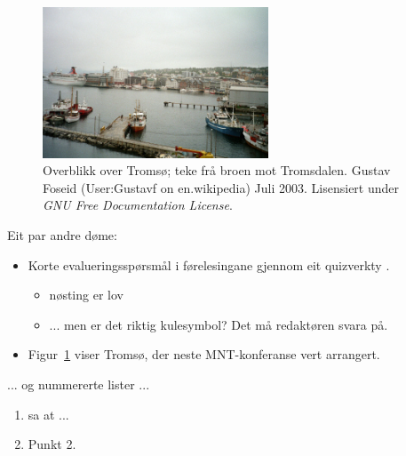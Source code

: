 \documentclass[nynorsk]{mnt}
\begin{document}
\begin{figure}
\begin{center}
  \includegraphics[width=0.6\textwidth]{tromso}
\end{center}
  \caption{Overblikk over Tromsø; teke frå broen mot Tromsdalen.
    Gustav Foseid (User:Gustavf on en.wikipedia)
    Juli 2003.
    Lisensiert under \emph{GNU Free Documentation License}.
    }
  \label{fig}
\end{figure}

Eit par andre døme:
\begin{itemize}
  \item 
Korte evalueringsspørsmål i førelesingane gjennom eit
      quizverkty \citep{hgs2018udit}.
   \begin{itemize}
     \item nøsting er lov
     \item ... men er det riktig kulesymbol?  Det må redaktøren svara på.
   \end{itemize}
  \item 
Figur~\ref{fig} viser Tromsø, der neste MNT-konferanse vert arrangert.
\end{itemize}

... og nummererte lister ...
\begin{enumerate}
  \item 
    \cite{biggs11a} sa at ...
  \item Punkt 2.
\end{enumerate}
\end{document}
